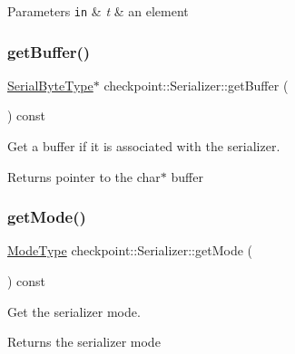 \begin{DoxyParams}[1]{Parameters}
\mbox{\tt in}  & {\em t} & an element \\
\hline
\end{DoxyParams}
\mbox{\label{structcheckpoint_1_1_serializer_a6231bd380e02ee8668e7a6efebca2664}} 
\subsubsection{\texorpdfstring{get\+Buffer()}{getBuffer()}}
{\footnotesize\ttfamily \hyperlink{namespacecheckpoint_ae57f01cdc0b81776c23b6c7c934c58f5}{Serial\+Byte\+Type}$\ast$ checkpoint\+::\+Serializer\+::get\+Buffer (\begin{DoxyParamCaption}{ }\end{DoxyParamCaption}) const\hspace{0.3cm}{\ttfamily [inline]}}



Get a buffer if it is associated with the serializer. 

\begin{DoxyReturn}{Returns}
pointer to the {\ttfamily char$\ast$} buffer 
\end{DoxyReturn}
\mbox{\label{structcheckpoint_1_1_serializer_a2b22a87a81fb9ff1b00dd96bbe4debe2}} 
\subsubsection{\texorpdfstring{get\+Mode()}{getMode()}}
{\footnotesize\ttfamily \hyperlink{namespacecheckpoint_ae2509499ccd8b1dc48fb535bf8aa3059}{Mode\+Type} checkpoint\+::\+Serializer\+::get\+Mode (\begin{DoxyParamCaption}{ }\end{DoxyParamCaption}) const\hspace{0.3cm}{\ttfamily [inline]}}



Get the serializer mode. 

\begin{DoxyReturn}{Returns}
the serializer mode 
\end{DoxyReturn}
\mbox{\label{structcheckpoint_1_1_serializer_af2fc82901c31232b7549b20a8732de30}} 
